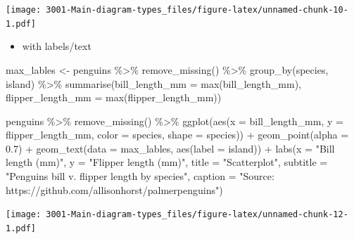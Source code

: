 \documentclass[
]{book}
\newenvironment{Shaded}{\begin{snugshade}}{\end{snugshade}}
\newcommand{\AttributeTok}[1]{\textcolor[rgb]{0.77,0.63,0.00}{#1}}
\newcommand{\FloatTok}[1]{\textcolor[rgb]{0.00,0.00,0.81}{#1}}
\newcommand{\FunctionTok}[1]{\textcolor[rgb]{0.00,0.00,0.00}{#1}}
\newcommand{\NormalTok}[1]{#1}
\newcommand{\OtherTok}[1]{\textcolor[rgb]{0.56,0.35,0.01}{#1}}
\newcommand{\SpecialCharTok}[1]{\textcolor[rgb]{0.00,0.00,0.00}{#1}}
\newcommand{\StringTok}[1]{\textcolor[rgb]{0.31,0.60,0.02}{#1}}
\providecommand{\tightlist}{%
  \setlength{\itemsep}{0pt}\setlength{\parskip}{0pt}}
\begin{document}
\texttt{[image: 3001-Main-diagram-types\_files/figure-latex/unnamed-chunk-10-1.pdf]}

\begin{itemize}
\tightlist
\item
  with labels/text
\end{itemize}

\begin{Shaded}
\begin{Highlighting}[]
\NormalTok{max\_lables }\OtherTok{\textless{}{-}}\NormalTok{ penguins }\SpecialCharTok{\%\textgreater{}\%}
    \FunctionTok{remove\_missing}\NormalTok{() }\SpecialCharTok{\%\textgreater{}\%}
    \FunctionTok{group\_by}\NormalTok{(species, island) }\SpecialCharTok{\%\textgreater{}\%}
    \FunctionTok{summarise}\NormalTok{(}\AttributeTok{bill\_length\_mm =} \FunctionTok{max}\NormalTok{(bill\_length\_mm),}
              \AttributeTok{flipper\_length\_mm =} \FunctionTok{max}\NormalTok{(flipper\_length\_mm))}
\end{Highlighting}
\end{Shaded}

\begin{Shaded}
\begin{Highlighting}[]
\NormalTok{penguins }\SpecialCharTok{\%\textgreater{}\%}
    \FunctionTok{remove\_missing}\NormalTok{() }\SpecialCharTok{\%\textgreater{}\%}
    \FunctionTok{ggplot}\NormalTok{(}\FunctionTok{aes}\NormalTok{(}\AttributeTok{x =}\NormalTok{ bill\_length\_mm, }\AttributeTok{y =}\NormalTok{ flipper\_length\_mm,}
              \AttributeTok{color =}\NormalTok{ species, }\AttributeTok{shape =}\NormalTok{ species)) }\SpecialCharTok{+}
    \FunctionTok{geom\_point}\NormalTok{(}\AttributeTok{alpha =} \FloatTok{0.7}\NormalTok{) }\SpecialCharTok{+}
    \FunctionTok{geom\_text}\NormalTok{(}\AttributeTok{data =}\NormalTok{ max\_lables, }\FunctionTok{aes}\NormalTok{(}\AttributeTok{label =}\NormalTok{ island)) }\SpecialCharTok{+}
    \FunctionTok{labs}\NormalTok{(}\AttributeTok{x =} \StringTok{"Bill length (mm)"}\NormalTok{, }
         \AttributeTok{y =} \StringTok{"Flipper length (mm)"}\NormalTok{,}
        \AttributeTok{title =} \StringTok{"Scatterplot"}\NormalTok{, }
        \AttributeTok{subtitle =} \StringTok{"Penguins bill v. flipper length by species"}\NormalTok{,}
        \AttributeTok{caption =} \StringTok{"Source: https://github.com/allisonhorst/palmerpenguins"}\NormalTok{)}
\end{Highlighting}
\end{Shaded}

\texttt{[image: 3001-Main-diagram-types\_files/figure-latex/unnamed-chunk-12-1.pdf]}
\end{document}
